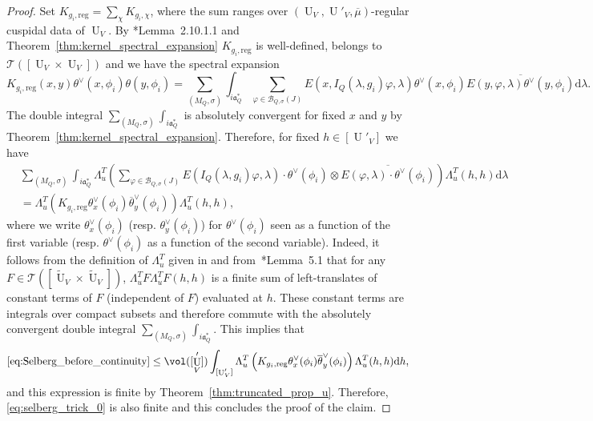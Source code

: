 \documentclass[letterpaper,11pt]{amsart}
\newcommand{\cT}{\mathcal{T}}
\newcommand{\rd}{\mathrm{d}}
\newcommand{\<}{\negthickspace}
\DeclareMathOperator{\U}{U}
\theoremstyle{definition}
\theoremstyle{plain}
\theoremstyle{remark}
\numberwithin{equation}{section}
\begin{document}
\begin{proof}
Set $ K_{g_i,\mathrm{reg}}=\sum_{\chi } K_{g_i,\chi}$, where the sum ranges over $(\U_V,\U'_V,\overline{\mu})$-regular cuspidal data of $\U_V$. By \cite{BPCZ}*{Lemma~2.10.1.1} and Theorem~\ref{thm:kernel_spectral_expansion} $ K_{g_i,\mathrm{reg}}$ is well-defined, belongs to $\cT([\U_V \times \U_V])$ and we have the spectral expansion
\begin{equation*}
     K_{g_i,\mathrm{reg}}(x,y) \theta^\vee(x,\phi_i) \theta(y,\phi_i) 
     = \sum_{(M_Q,\sigma)} \int_{ i \mathfrak{a}_Q^*}\sum_{\varphi \in \mathcal{B}_{Q,\sigma}(J)} E(x,I_Q(\lambda,g_i) \varphi,\lambda)\theta^\vee(x,\phi_i) \overline{E(y,\varphi,\lambda)
     \theta^\vee(y,\phi_i)}  \rd \lambda. 
\end{equation*}
The double integral $\sum_{(M_Q,\sigma)} \int_{ i \mathfrak{a}_Q^*}$ is absolutely convergent for fixed $x$ and $y$ by Theorem~\ref{thm:kernel_spectral_expansion}. Therefore, for fixed $h \in [\U'_V]$ we have
\begin{align*}
    &\sum_{(M_Q,\sigma)} \int_{ i \mathfrak{a}_Q^*}\Lambda_u^T \left(\sum_{\varphi \in \mathcal{B}_{Q,\sigma}(J)} E(I_Q(\lambda,g_i) \varphi,\lambda)
    \cdot \theta^\vee(\phi_i) \otimes \overline{E(\varphi,\lambda)
    \cdot \theta^\vee(\phi_i)} \right) \Lambda_u^T(h,h)   \rd \lambda  \\
    &= \Lambda_u^T \left(K_{g_i,\mathrm{reg}} \theta^\vee_x(\phi_i)\overline{\theta}^\vee_y(\phi_i) \right)\Lambda_u^T(h,h),
\end{align*}
where we write $\theta_x^\vee(\phi_i)$ (resp. $\theta_y^\vee(\phi_i)$) for $\theta^\vee(\phi_i)$ seen as a function of the first variable (resp. $\theta^\vee(\phi_i)$ as a function of the second variable). Indeed, it follows from the definition of $\Lambda_u^T$ given in \cite[Section~7.5]{BLX1} and from~\cite{Arthur3}*{Lemma~5.1} that for any $F \in \cT([\widetilde{\U}_V \times \widetilde{\U}_V])$, $\Lambda_u^T F \Lambda_u^T F(h,h)$ is a finite sum of left-translates of constant terms of $F$ (independent of $F$) evaluated at $h$. These constant terms are integrals over compact subsets and therefore commute with the absolutely convergent double integral $\sum_{(M_Q,\sigma)} \int_{ i \mathfrak{a}_Q^*}$. This implies that
\begin{equation*}
    \eqref{eq:Selberg_before_continuity} \leq  \vol([\U'_V]) \int_{[\U'_V]} \Lambda_u^T \left(K_{g_i,\mathrm{reg}} \theta^\vee_x(\phi_i)\overline{\theta}^\vee_y(\phi_i) \right)\Lambda_u^T(h,h) \rd h,
\end{equation*}
and this expression is finite by Theorem~\ref{thm:truncated_prop_u}. Therefore, \eqref{eq:selberg_trick_0} is also finite and this concludes the proof of the claim.


\end{proof}
\end{document}
